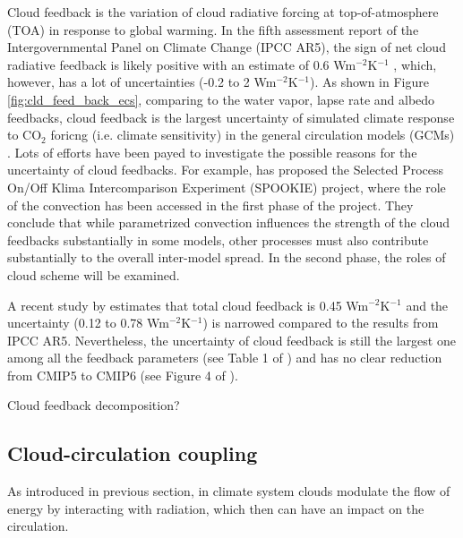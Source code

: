 Cloud feedback is the variation of cloud radiative forcing at top-of-atmosphere (TOA) in response to global warming. In the fifth assessment report of the Intergovernmental Panel on Climate Change (IPCC AR5), the sign of net cloud radiative feedback is likely positive with an estimate of 0.6 Wm$^{-2}$K$^{-1}$ \citep{stocker2013climate}, which, however, has a lot of uncertainties (-0.2 to 2 Wm$^{-2}$K$^{-1}$). As shown in Figure \ref{fig:cld_feed_back_ecs}, comparing to the water vapor, lapse rate and albedo feedbacks, cloud feedback is the largest uncertainty of simulated climate response to CO$_2$ foricng (i.e. climate sensitivity) in the general circulation models (GCMs) \citep{Ceppi2017}. Lots of efforts have been payed to investigate the possible reasons for the uncertainty of cloud feedbacks. For example, \cite{Webb2015} has proposed the Selected Process On/Off Klima Intercomparison Experiment (SPOOKIE) project, where the role of the convection has been accessed in the first phase of the project. They conclude that while parametrized convection influences the strength of the cloud feedbacks substantially in some models, other processes must also contribute substantially to the overall inter-model spread. In the second phase, the roles of cloud scheme will be examined. %

A recent study by \cite{Sherwood2020} estimates that total cloud feedback is 0.45 Wm$^{-2}$K$^{-1}$ and the uncertainty (0.12 to 0.78 Wm$^{-2}$K$^{-1}$) is narrowed compared to the results from IPCC AR5. Nevertheless, the uncertainty of cloud feedback is still the largest one among all the feedback parameters (see Table 1 of \citealt{Sherwood2020}) and has no clear reduction from CMIP5 to CMIP6 (see Figure 4 of \citealt{Sherwood2020}).

Cloud feedback decomposition? 


\subsection{Cloud-circulation coupling}
\label{sec:cloud_circulation_coupling}

As introduced in previous section, in climate system clouds modulate the flow of energy by interacting with radiation, which then can have an impact on the circulation.

